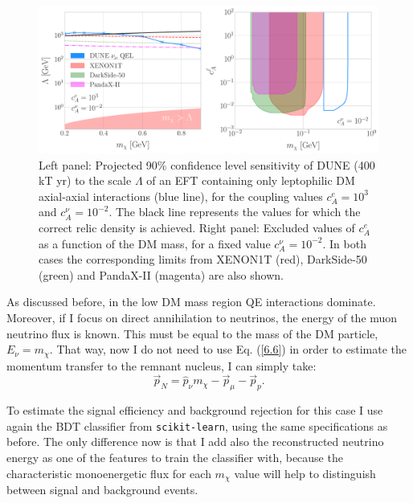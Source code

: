 \begin{figure}[t]
	\centering
	\includegraphics[width=1\linewidth]{Images/DM_Analysis/eft_bounds.pdf}
	\caption[Projected 90\% confidence level sensitivity of DUNE to the scale $\Lambda$ of an EFT containing only leptophilic DM axial-axial interactions.]{Left panel: Projected 90\% confidence level sensitivity of DUNE (400 kT yr) to the scale $\Lambda$ of an EFT containing only leptophilic DM axial-axial interactions (blue line), for the coupling values $c_{A}^{e} = 10^{3}$ and $c_{A}^{\nu} = 10^{-2}$. The black line represents the values for which the correct relic density is achieved. Right panel: Excluded values of $c_{A}^{e}$ as a function of the DM mass, for a fixed value $c_{A}^{\nu} = 10^{-2}$. In both cases the corresponding limits from XENON1T \cite{XENON2019} (red), DarkSide-50 \cite{DarkSide2022} (green) and PandaX-II \cite{PandaX-II2021} (magenta) are also shown.}
	\label{fig:eft_bounds}
\end{figure}

As discussed before, in the low DM mass region QE interactions dominate. Moreover, if I focus on direct annihilation to neutrinos, the energy of the muon neutrino flux is known. This must be equal to the mass of the DM particle, $E_{\nu} = m_{\chi}$. That way, now I do not need to use Eq. (\ref{6.6}) in order to estimate the momentum transfer to the remnant nucleus, I can simply take:
\begin{equation}\label{7.6}
	\vec{p}_{N} = \hat{p}_{\nu} m_{\chi} - \vec{p}_{\mu} - \vec{p}_{p}.
\end{equation}

To estimate the signal efficiency and background rejection for this case I use again the BDT classifier from \texttt{scikit-learn}, using the same specifications as before. The only difference now is that I add also the reconstructed neutrino energy as one of the features to train the classifier with, because the characteristic monoenergetic flux for each $m_{\chi}$ value will help to distinguish between signal and background events.

